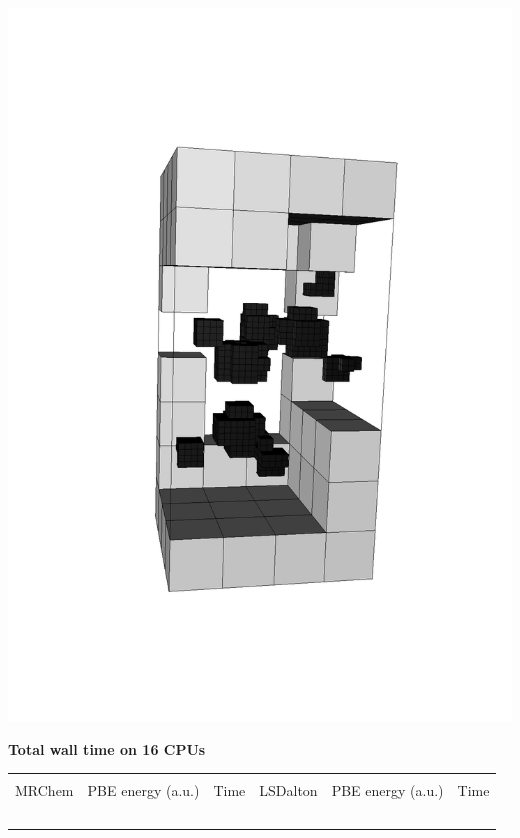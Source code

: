 \begin{frame}
\begin{minipage}{0.5\textwidth}
\includegraphics[angle=-90, scale=0.25, viewport = 170 150 470 700, clip]{figures/methyloxirane_grid.pdf}
\end{minipage}
\begin{table}
    \centering
    \textbf{Total wall time on 16 CPUs}
    \begin{tabular}{rcr|rcr}
    \hline               
    \hline               
                         &                   &                &                &                   &                \\
    MRChem               & PBE energy (a.u.) & Time           & LSDalton       & PBE energy (a.u.) & Time           \\
    \hspace{10mm}\       & \hspace{20mm}\    & \hspace{05mm}\ & \hspace{10mm}\ & \hspace{05mm}\    & \hspace{05mm}\ \\

\end{tabular}
\end{table}
\end{frame}
